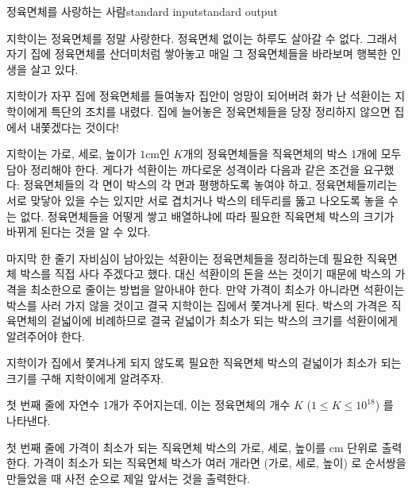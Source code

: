 \begin{problem}{정육면체를 사랑하는 사람}{standard input}{standard output}

지학이는 정육면체를 정말 사랑한다. 정육면체 없이는 하루도 살아갈 수 없다.
그래서 자기 집에 정육면체를 산더미처럼 쌓아놓고 매일 그 정육면체들을 바라보며 행복한 인생을 살고 있다.

지학이가 자꾸 집에 정육면체를 들여놓자 집안이 엉망이 되어버려 화가 난 석환이는 지학이에게 특단의 조치를 내렸다.
집에 늘어놓은 정육면체들을 당장 정리하지 않으면 집에서 내쫓겠다는 것이다!

지학이는 가로, 세로, 높이가 $1$cm인 $K$개의 정육면체들을 직육면체의 박스 1개에 모두 담아 정리해야 한다.
게다가 석환이는 까다로운 성격이라 다음과 같은 조건을 요구했다: 
정육면체들의 각 면이 박스의 각 면과 평행하도록 놓여야 하고, 
정육면체들끼리는 서로 맞닿아 있을 수는 있지만 서로 겹치거나 박스의 테두리를 뚫고 나오도록 놓을 수는 없다.
정육면체들을 어떻게 쌓고 배열하냐에 따라 필요한 직육면체 박스의 크기가 바뀌게 된다는 것을 알 수 있다.

마지막 한 줄기 자비심이 남아있는 석환이는 정육면체들을 정리하는데 필요한 직육면체 박스를 직접 사다 주겠다고 했다.
대신 석환이의 돈을 쓰는 것이기 때문에 박스의 가격을 최소한으로 줄이는 방법을 알아내야 한다.
만약 가격이 최소가 아니라면 석환이는 박스를 사러 가지 않을 것이고 결국 지학이는 집에서 쫓겨나게 된다.
박스의 가격은 직육면체의 겉넓이에 비례하므로 결국 겉넓이가 최소가 되는 박스의 크기를 석환이에게 알려주어야 한다.

지학이가 집에서 쫓겨나게 되지 않도록 필요한 직육면체 박스의 겉넓이가 최소가 되는 크기를 구해 지학이에게 알려주자.

\InputFile
첫 번째 줄에 자연수 1개가 주어지는데, 이는 정육면체의 개수 $K$ ($1 \le K \le 10^{18}$) 를 나타낸다.

\OutputFile
첫 번째 줄에 가격이 최소가 되는 직육면체 박스의 가로, 세로, 높이를 cm 단위로 출력한다.
가격이 최소가 되는 직육면체 박스가 여러 개라면 (가로, 세로, 높이) 로 순서쌍을 만들었을 때
사전 순으로 제일 앞서는 것을 출력한다.

\Example

\begin{example}
%
%
\end{example}

\end{problem}
